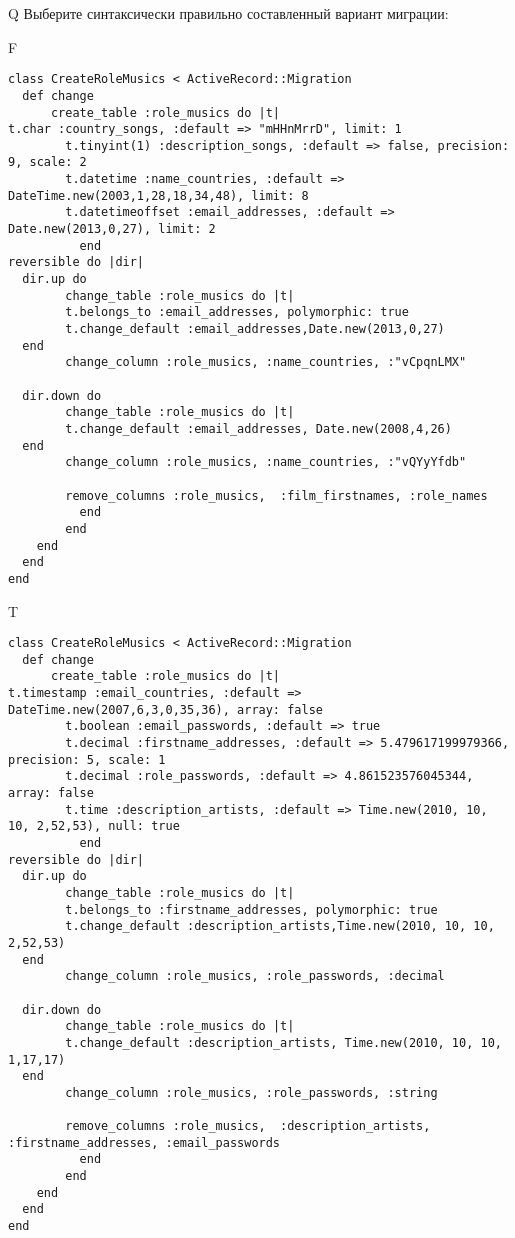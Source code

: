 Q
Выберите синтаксически правильно составленный вариант миграции:

F
\begin{verbatim}
class CreateRoleMusics < ActiveRecord::Migration
  def change
	  create_table :role_musics do |t|
t.char :country_songs, :default => "mHHnMrrD", limit: 1
		t.tinyint(1) :description_songs, :default => false, precision: 9, scale: 2
		t.datetime :name_countries, :default => DateTime.new(2003,1,28,18,34,48), limit: 8
		t.datetimeoffset :email_addresses, :default => Date.new(2013,0,27), limit: 2
		  end
reversible do |dir|
  dir.up do
		change_table :role_musics do |t|
		t.belongs_to :email_addresses, polymorphic: true
 		t.change_default :email_addresses,Date.new(2013,0,27)
  end
 		change_column :role_musics, :name_countries, :"vCpqnLMX"
   
  dir.down do
		change_table :role_musics do |t|
		t.change_default :email_addresses, Date.new(2008,4,26)
  end
 		change_column :role_musics, :name_countries, :"vQYyYfdb"
   
		remove_columns :role_musics,  :film_firstnames, :role_names 
	      end
	    end
    end 
  end
end

\end{verbatim}

T
\begin{verbatim}
class CreateRoleMusics < ActiveRecord::Migration
  def change
	  create_table :role_musics do |t|
t.timestamp :email_countries, :default => DateTime.new(2007,6,3,0,35,36), array: false
		t.boolean :email_passwords, :default => true
		t.decimal :firstname_addresses, :default => 5.479617199979366, precision: 5, scale: 1
		t.decimal :role_passwords, :default => 4.861523576045344, array: false
		t.time :description_artists, :default => Time.new(2010, 10, 10, 2,52,53), null: true
		  end
reversible do |dir|
  dir.up do
		change_table :role_musics do |t|
		t.belongs_to :firstname_addresses, polymorphic: true
 		t.change_default :description_artists,Time.new(2010, 10, 10, 2,52,53)
  end
 		change_column :role_musics, :role_passwords, :decimal
   
  dir.down do
		change_table :role_musics do |t|
		t.change_default :description_artists, Time.new(2010, 10, 10, 1,17,17)
  end
 		change_column :role_musics, :role_passwords, :string
   
		remove_columns :role_musics,  :description_artists, :firstname_addresses, :email_passwords 
	      end
	    end
    end 
  end
end

\end{verbatim}

